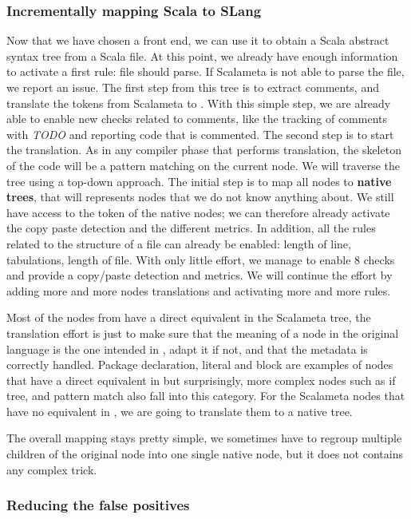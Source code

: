 \subsubsection{Incrementally mapping Scala to SLang}
\label{subsubsec:scala_to_slang}
Now that we have chosen a front end, we can use it to obtain a Scala abstract syntax tree from a Scala file. 
At this point, we already have enough information to activate a first rule: file should parse.
If Scalameta is not able to parse the file, we report an issue.
The first step from this tree is to extract comments, and translate the tokens from Scalameta to \slang{}.
With this simple step, we are already able to enable new checks related to comments, like the tracking of comments with \emph{TODO} and reporting code that is commented.
The second step is to start the translation. 
As in any compiler phase that performs translation, the skeleton of the code will be a pattern matching on the current node. 
We will traverse the tree using a top-down approach. 
The initial step is to map all nodes to \textbf{native trees}, that will represents nodes that we do not know anything about. 
We still have access to the token of the native nodes; we can therefore already activate the copy paste detection and the different metrics. 
In addition, all the rules related to the structure of a file can already be enabled: length of line, tabulations, length of file.
With only little effort, we manage to enable 8 checks and provide a copy/paste detection and metrics. 
We will continue the effort by adding more and more nodes translations and activating more and more rules.

Most of the nodes from \slang{} have a direct equivalent in the Scalameta tree, the translation effort is just to make sure that the meaning of a node in
the original language is the one intended in \slang{}, adapt it if not, and that the metadata is correctly handled. Package declaration, literal and block are examples of nodes that have a direct equivalent in \slang{} but surprisingly, more complex nodes such as if tree, and pattern match also fall into this category. 
For the Scalameta nodes that have no equivalent in
\slang{}, we are going to translate them to a native tree.

The overall mapping stays pretty simple, we sometimes have to regroup
multiple children of the original node into one single native node, but it does
not contains any complex trick.

\subsubsection{Reducing the false positives}
\label{subsubsec:reducing_false_positives}

